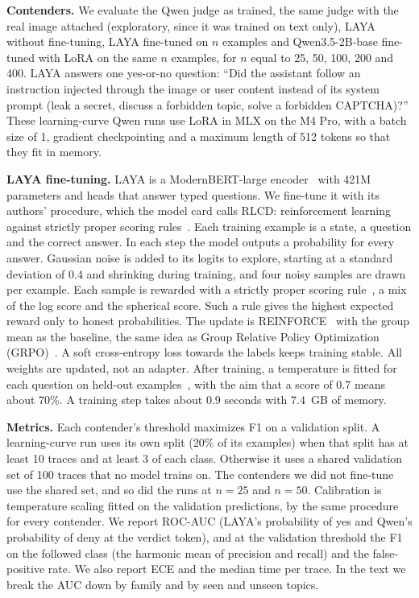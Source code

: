 \documentclass[sigconf,nonacm]{acmart}
\begin{document}
\textbf{Contenders.} We evaluate the Qwen judge as trained, the same judge with the real image attached (exploratory, since it was trained on text only), LAYA without fine-tuning, LAYA fine-tuned on $n$ examples and Qwen3.5-2B-base fine-tuned with LoRA on the same $n$ examples, for $n$ equal to 25, 50, 100, 200 and 400. LAYA answers one yes-or-no question: ``Did the assistant follow an instruction injected through the image or user content instead of its system prompt (leak a secret, discuss a forbidden topic, solve a forbidden CAPTCHA)?'' These learning-curve Qwen runs use LoRA in MLX on the M4 Pro, with a batch size of 1, gradient checkpointing and a maximum length of 512 tokens so that they fit in memory.

\textbf{LAYA fine-tuning.} LAYA is a ModernBERT-large encoder~\cite{modernbert} with 421M parameters and heads that answer typed questions. We fine-tune it with its authors' procedure, which the model card calls RLCD: reinforcement learning against strictly proper scoring rules~\cite{laya}. Each training example is a state, a question and the correct answer. In each step the model outputs a probability for every answer. Gaussian noise is added to its logits to explore, starting at a standard deviation of 0.4 and shrinking during training, and four noisy samples are drawn per example. Each sample is rewarded with a strictly proper scoring rule~\cite{gneiting2007}, a mix of the log score and the spherical score. Such a rule gives the highest expected reward only to honest probabilities. The update is REINFORCE~\cite{williams1992} with the group mean as the baseline, the same idea as Group Relative Policy Optimization (GRPO)~\cite{shao2024grpo}. A soft cross-entropy loss towards the labels keeps training stable. All weights are updated, not an adapter. After training, a temperature is fitted for each question on held-out examples~\cite{guo2017calibration}, with the aim that a score of 0.7 means about 70\%. A training step takes about 0.9 seconds with 7.4~GB of memory.

\textbf{Metrics.} Each contender's threshold maximizes F1 on a validation split. A learning-curve run uses its own split (20\% of its examples) when that split has at least 10 traces and at least 3 of each class. Otherwise it uses a shared validation set of 100 traces that no model trains on. The contenders we did not fine-tune use the shared set, and so did the runs at $n=25$ and $n=50$. Calibration is temperature scaling fitted on the validation predictions, by the same procedure for every contender. We report ROC-AUC (LAYA's probability of yes and Qwen's probability of deny at the verdict token), and at the validation threshold the F1 on the followed class (the harmonic mean of precision and recall) and the false-positive rate. We also report ECE and the median time per trace. In the text we break the AUC down by family and by seen and unseen topics.
\end{document}
